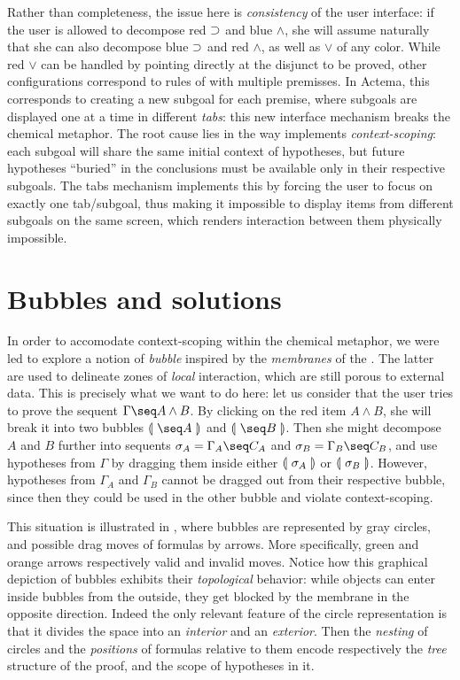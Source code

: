 Rather than completeness, the issue here is \emph{consistency} of the user
interface: if the user is allowed to decompose red $\supset$ and blue $\land$, she
will assume naturally that she can also decompose blue $\supset$ and red $\land$,
as well as $\lor$ of any color. While red $\lor$ can be handled by pointing
directly at the disjunct to be proved, other configurations correspond to rules
of  with multiple premisses. In Actema, this corresponds to
creating a new subgoal for each premise, where subgoals are displayed one at a
time in different \emph{tabs}: this new interface mechanism breaks the chemical
metaphor. The root cause lies in the way  implements
\emph{context-scoping}: each subgoal will share the same initial context of
hypotheses, but future hypotheses ``buried'' in the conclusions must be
available only in their respective subgoals. The tabs mechanism implements this
by forcing the user to focus on exactly one tab/subgoal, thus making it
impossible to display items from different subgoals on the same screen, which
renders interaction between them physically impossible.


\section{Bubbles and solutions}

In order to accomodate context-scoping within the chemical metaphor, we were led
to explore a notion of \emph{bubble} inspired by the \emph{membranes} of the
{\cham} . The latter are used to delineate zones
of \emph{local} interaction, which are still porous to external data. This is
precisely what we want to do here: let us consider that the user tries to prove
the sequent $\Gamma \seq A \land B$. By clicking on the red item $A \land B$,
she will break it into two bubbles $\bubbleT{\seq A}$ and $\bubbleT{\seq B}$.
Then she might decompose $A$ and $B$ further into sequents $\sigma_A = \Gamma_A
\seq C_A$ and $\sigma_B = \Gamma_B \seq C_B$, and use hypotheses from $\Gamma$
by dragging them inside either $\llparenthesis~\sigma_A~\rrparenthesis$ or $\llparenthesis~\sigma_B~\rrparenthesis$.
However, hypotheses from $\Gamma_A$ and $\Gamma_B$ cannot be dragged out from
their respective bubble, since then they could be used in the other bubble and
violate context-scoping.

This situation is illustrated in , where bubbles are
represented by gray circles, and possible drag moves of formulas by arrows. More
specifically, green and orange arrows  respectively valid and invalid
moves. Notice how this graphical depiction of bubbles exhibits their
\emph{topological} behavior: while objects can enter inside bubbles from the
outside, they get blocked by the membrane in the opposite direction. Indeed the
only relevant feature of the circle representation is that it divides the space
into an \emph{interior} and an \emph{exterior}. Then the \emph{nesting} of
circles and the \emph{positions} of formulas relative to them encode
respectively the \emph{tree} structure of the proof, and the scope of hypotheses
in it.

